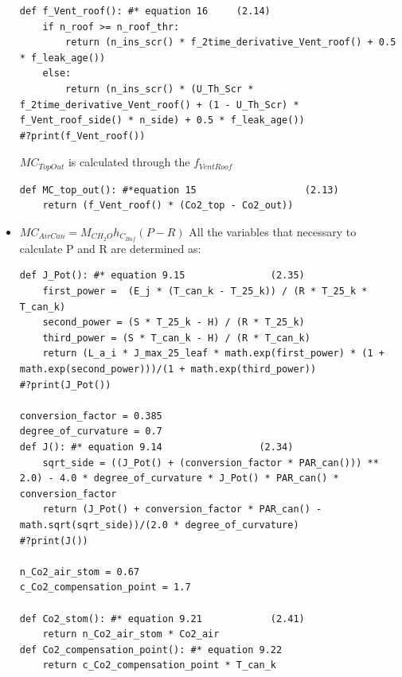 \documentclass[a4paper]{article}
\numberwithin{equation}{section}
\begin{document}
\begin{itemize}
\begin{mdframed}[leftline=false,rightline=false,backgroundcolor=cyan!10]
\begin{verbatim}
def f_Vent_roof(): #* equation 16     (2.14)
    if n_roof >= n_roof_thr:
        return (n_ins_scr() * f_2time_derivative_Vent_roof() + 0.5 * f_leak_age())
    else:
        return (n_ins_scr() * (U_Th_Scr * f_2time_derivative_Vent_roof() + (1 - U_Th_Scr) * f_Vent_roof_side() * n_side) + 0.5 * f_leak_age())
#?print(f_Vent_roof())
\end{verbatim}
\end{mdframed}
$MC_{TopOut}$ is calculated through the $f_{VentRoof}$
\begin{mdframed}[leftline=false,rightline=false,backgroundcolor=cyan!10]
  \begin{verbatim}
def MC_top_out(): #*equation 15                   (2.13)
    return (f_Vent_roof() * (Co2_top - Co2_out))
\end{verbatim}
\end{mdframed}
\item $MC_{AirCan} = M_{CH_2O} h_{C_{Buf}} (P - R)$
All the variables that necessary to calculate P and R are determined as:
\begin{mdframed}[leftline=false,rightline=false,backgroundcolor=cyan!10]
  \begin{verbatim}
def J_Pot(): #* equation 9.15               (2.35)
    first_power =  (E_j * (T_can_k - T_25_k)) / (R * T_25_k * T_can_k)
    second_power = (S * T_25_k - H) / (R * T_25_k)
    third_power = (S * T_can_k - H) / (R * T_can_k) 
    return (L_a_i * J_max_25_leaf * math.exp(first_power) * (1 + math.exp(second_power)))/(1 + math.exp(third_power))
#?print(J_Pot())

conversion_factor = 0.385
degree_of_curvature = 0.7
def J(): #* equation 9.14                 (2.34)
    sqrt_side = ((J_Pot() + (conversion_factor * PAR_can())) ** 2.0) - 4.0 * degree_of_curvature * J_Pot() * PAR_can() * conversion_factor
    return (J_Pot() + conversion_factor * PAR_can() - math.sqrt(sqrt_side))/(2.0 * degree_of_curvature)
#?print(J())

n_Co2_air_stom = 0.67
c_Co2_compensation_point = 1.7

def Co2_stom(): #* equation 9.21            (2.41)
    return n_Co2_air_stom * Co2_air
def Co2_compensation_point(): #* equation 9.22 
    return c_Co2_compensation_point * T_can_k


\end{verbatim}
\end{mdframed}
\end{itemize}
\end{document}
